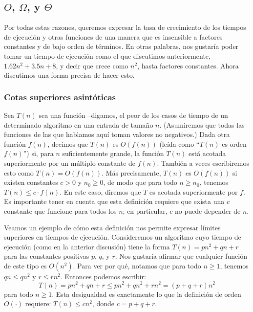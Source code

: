 \documentclass[a4paper, 12pt]{book}
\begin{document}
\subsection*{$O$, $\Omega$, y $\Theta$}

Por todas estas razones, queremos expresar la tasa de crecimiento de los tiempos de ejecución y otras funciones de una manera que es insensible a factores constantes y de bajo orden de términos. En otras palabras, nos gustaría poder tomar un tiempo de ejecución como el que discutimos anteriormente, $1.62n^2 + 3.5n + 8$, y decir que crece como $n^2$, hasta factores constantes. Ahora discutimos una forma precisa de hacer esto.

\subsubsection*{Cotas superiores asintóticas}
Sea $T(n)$ sea una función --digamos, el peor de los casos de tiempo de un determinado algoritmo en una entrada de tamaño $n$. (Asumiremos que todas las funciones de las que hablamos aquí toman valores no negativos.) Dada otra función $f(n)$, decimos que $T(n)$ es $O(f(n))$ (leída como ``$T(n)$ es orden $f(n)$'') si, para $n$ suficientemente grande, la función $T(n)$ está acotada superiormente por un múltiplo constante de $f(n)$. También a veces escribiremos esto como $T(n) = O(f(n))$. Más precisamente, $T(n)$ es $O(f(n))$ si existen constantes $c > 0$ y $n_0 \geq 0$, de modo que para todo $n \geq n_0$, tenemos $T(n) \leq c \cdot f(n)$. En este caso, diremos que $T$ es acotada superiormente por $f$. Es importante tener en cuenta que esta definición requiere que exista una $c$ constante que funcione para todos los $n$; en particular, $c$ no puede depender de $n$. 

Veamos un ejemplo de cómo esta definición nos permite expresar límites superiores en tiempos de ejecución. Consideremos un algoritmo cuyo tiempo de ejecución (como en la anterior discusión) tiene la forma $T(n) = pn^2 + qn + r$ para las constantes positivas $p$, $q$, y $r$. Nos gustaría afirmar que cualquier función de este tipo es $O(n^2)$. Para ver por qué, notamos que para todo $n \geq 1$, tenemos $qn \leq qn^2$ y $r ≤ rn^2$. Entonces podemos escribir: 
%
$$T(n) = pn^2 + qn + r \leq pn^2+ qn^2 + rn^2 = (p + q + r)n^2$$ 
%
para todo $n \geq 1$. Esta desigualdad es exactamente lo que la definición de orden $O(\cdot)$ requiere: $T(n) \leq cn^2$, donde $c = p + q + r$. 
\end{document}
